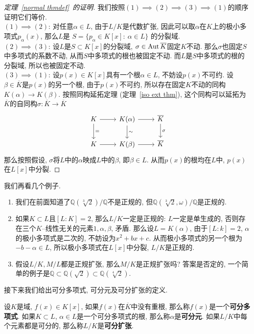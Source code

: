 \begin{proof}[定理~\ref{normal thmdef}~的证明]
    我们按照$(1)\implies(2)\implies(3)\implies(1)$的顺序证明它们等价.\\
    $(1)\implies(2)$: 对任意$\alpha\in L$, 由于$L/K$是代数扩张, 因此可以取$\alpha$在$K$上的极小多项式$p_\alpha(x)$, 那么$L$是
    \(S=\{p_\alpha\in K[x]:\ \alpha\in L\}\)
    的分裂域.\\
    $(2)\implies(3)$: 设$L$是$S\subset K[x]$的分裂域, $\sigma\in\operatorname{Aut}{\overline{K}}$固定$K$不动.
    那么$\sigma$也固定$S$中多项式的系数不动, 从而$S$中多项式的根也被固定不动.
    而$L$是$S$中多项式的根的分裂域, 所以也被固定不动.\\
    $(3)\implies(1)$: 设$p(x)\in K[x]$具有一个根$\alpha\in L$, 不妨设$p(x)$不可约.
    设$\beta\in\overline{K}$是$p(x)$的另一个根, 由于$p(x)$不可约, 所以存在固定$K$不动的同构$K(\alpha)\to K(\beta)$.
    按照同构延拓定理 (定理~\ref{iso ext thm}), 这个同构可以延拓为$\overline{K}$的自同构$\sigma:\overline{K}\to\overline{K}$
    \[\begin{tikzcd}
        K \ar[d, "="] \ar[r] & K(\alpha) \ar[d, "\sim"] \ar[r] & \overline{K} \ar[d, "\sigma"]\\
        K \ar[r] & K(\beta) \ar[r] & \overline{K}
    \end{tikzcd}\]
    那么按照假设, $\sigma$将$L$中的$\alpha$映成$L$中的$\beta$, 即$\beta\in L$.
    从而$p(x)$的根均在$L$中, $p(x)$在$L[x]$中分裂.
\end{proof}

\begin{eg}我们再看几个例子.
    \begin{enumerate}[(1)]
        \item 我们在前面知道了$\mathbb{Q}(\sqrt[3]{2})/\mathbb{Q}$不是正规的, 但$\mathbb{Q}(\sqrt[3]{2},\omega)/\mathbb{Q}$是正规的.
        \item 如果$K\subset L$且$[L:K]=2$, 那么$L/K$一定是正规的:
        $L$一定是单生成的, 否则存在三个$K$--线性无关的元素$1,\alpha,\beta$, 矛盾.
        那么设$L=K(\alpha)$, 由于$[L:k]=2$, $\alpha$的极小多项式是二次的, 不妨设为$x^2+bx+c$.
        从而极小多项式的另一个根为$-b-\alpha\in L$, 所以极小多项式在$L[x]$中分裂, $L/K$是正规的.
        \item 假设$L/K,M/L$都是正规扩张, 那么$M/K$是正规扩张吗?
        答案是否定的, 一个简单的例子是$\mathbb{Q}\subset\mathbb{Q}(\sqrt{2})\subset\mathbb{Q}(\sqrt[4]{2})$.
    \end{enumerate}
\end{eg}

接下来我们给出可分多项式, 可分元及可分扩张的定义.
\begin{defn}
    设$K$是域, $f(x)\in K[x]$, 如果$f(x)$在$\overline{K}$中没有重根, 那么称$f(x)$是一个\textbf{可分多项式}.
    如果$K\subset L$, $\alpha\in L$是一个可分多项式的根, 那么称$\alpha$是\textbf{可分元}.
    如果$L/K$中每个元素都是可分的, 那么称$L/K$是\textbf{可分扩张}.
\end{defn}

